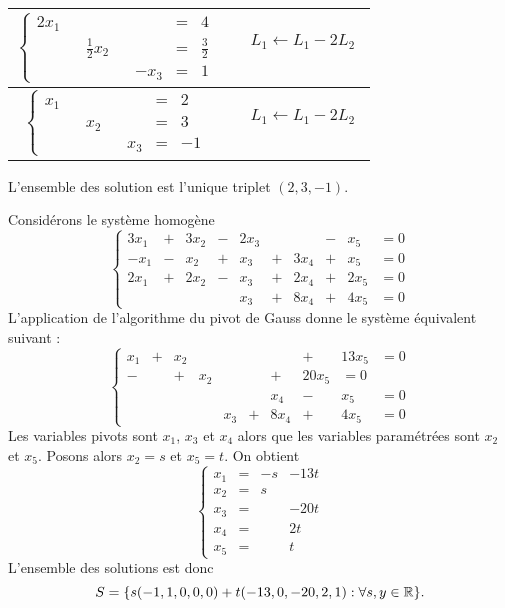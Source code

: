 \documentclass[a4paper]{book}
\begin{document}
\begin{Exemple}
\begin{center}
\begin{tabular}{c|c}
$\left\{\begin{matrix}2x_1&&&&&=&4&\\&&\frac 1 2x_2&&&=&\frac 3 2&\\&&&&-x_3&=&1&\end{matrix}\right.$&$\left.\begin{matrix}L_1\leftarrow L_1- 2L_2\\\\  \end{matrix}\right.$\\\hline
$\left\{\begin{matrix}x_1&&&&&=&2&\\&&x_2&&&=&3 &\\&&&&x_3&=&-1&\end{matrix}\right.$&$\left.\begin{matrix}L_1\leftarrow L_1- 2L_2\\\\  \end{matrix}\right.$\\\hline
\end{tabular}
\end{center}
L'ensemble des solution est l'unique triplet $(2,3,-1)$.
\end{Exemple}
\begin{Exemple}
 Considérons le système homogène
$$\left\{\begin{matrix}
3x_1 &+& 3x_2 &-& 2x_3   & &      &-& x_5 &= 0\\
-x_1 &-& x_2  &+& x_3  &+& 3x_4 &+& x_5 &= 0\\
2x_1 &+& 2x_2 &-& x_3 &+& 2x_4 &+& 2x_5 &= 0\\
     &&       & & x_3 &+& 8x_4 &+& 4x_5 &= 0
     \end{matrix}
\right.$$
L'application de l'algorithme du pivot de Gauss donne le système équivalent suivant :
$$\left\{\begin{matrix}
x_1 &+& x_2 &&    & &      &+& 13x_5 &= 0\\
 -&  &+& x_2 &&  &+& 20x_5 &= 0\\
 &&  && && x_4 &-& x_5 &= 0\\
     &&       & & x_3 &+& 8x_4 &+& 4x_5 &= 0
     \end{matrix}
\right.$$
Les variables pivots sont $x_1$, $x_3$ et $x_4$ alors que les variables paramétrées sont $x_2$ et $x_5$. Posons alors
$x_2 = s$ et  $x_5 = t$.
On obtient
$$\left\{\begin{matrix}
x_1 &=& -s &-13t\\
x_2 &=& s&\\
x_3 &=&&-20t\\
x_4&=&&2t\\
x_5 &=& &t
\end{matrix}
\right.$$
L'ensemble des solutions est donc
$$S=\{s(-1,1,0,0,0)+t(-13,0,-20,2,1):\forall s,y\in\mathbb{R}\}.$$
\end{Exemple}
\end{document}
